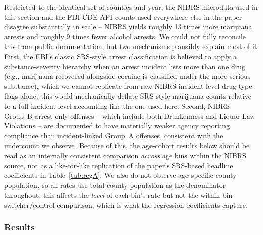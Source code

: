 \documentclass[11pt]{article}
\begin{document}
Restricted to the identical set of counties and year, the NIBRS
microdata used in this section and the FBI CDE API counts used
everywhere else in the paper disagree substantially in scale --
NIBRS yields roughly 13 times more marijuana arrests and roughly 9
times fewer alcohol arrests. We could not fully reconcile this from
public documentation, but two mechanisms plausibly explain most of
it. First, the FBI's classic SRS-style arrest classification is
believed to apply a substance-severity hierarchy when an arrest
incident lists more than one drug (e.g., marijuana recovered alongside
cocaine is classified under the more serious substance), which we
cannot replicate from raw NIBRS incident-level drug-type flags alone;
this would mechanically deflate SRS-style marijuana counts relative to
a full incident-level accounting like the one used here. Second, NIBRS
Group~B arrest-only offenses -- which include both Drunkenness and
Liquor Law Violations -- are documented to have materially weaker
agency reporting compliance than incident-linked Group~A offenses,
consistent with the undercount we observe. Because of this, the
age-cohort results below should be read as an internally consistent
comparison \emph{across} age bins within the NIBRS source, not as a
like-for-like replication of the paper's SRS-based headline
coefficients in Table~\ref{tab:regA}. We also do not observe
age-specific county population, so all rates use total county
population as the denominator throughout; this affects the
\emph{level} of each bin's rate but not the within-bin switcher/control
comparison, which is what the regression coefficients capture.

\subsubsection{Results}
\end{document}
